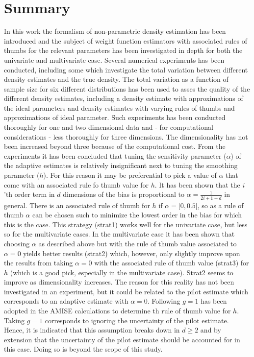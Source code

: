 \section{Summary}
In this work the formalism of non-parametric density estimation has been introduced and the subject of weight function estimators with associated rules of thumbs for the relevant parameters has been investigated in depth for both the univariate and multivariate case. Several numerical experiments has been conducted, including some which investigate the total variation between different density estimates and the true density. The total variation as a function of sample size for six different distributions has been used to asses the quality of the different density estimates, including a density estimate with approximations of the ideal parameters and density estimates with varying rules of thumbs and approximations of ideal parameter. Such experiments has been conducted thoroughly for one and two dimensional data and - for computational considerations - less thoroughly for three dimensions. The dimensionality has not been increased beyond three because of the computational cost. From the experiments it has been concluded that tuning the sensitivity parameter ($\alpha$) of the adaptive estimates is relatively insignificant next to tuning the smoothing parameter ($h$). For this reason it may be preferential to pick a value of $\alpha$ that come with an associated rule fo thumb value for $h$. It has been shown that the $i$'th order term in $d$ dimensions of the bias is proportional to $\alpha=\frac{1}{2i+1-d}$ in general. There is an associated rule of thumb for $h$ if $\alpha=[0,0.5[$, so as a rule of thumb $\alpha$ can be chosen such to minimize the lowest order in the bias for which this is the case. This strategy (strat1) works well for the univariate case, but less so for the multivariate cases. In the multivariate case it has been shown that choosing $\alpha$ as described above but with the rule of thumb value associated to $\alpha=0$ yields better results (strat2) which, however, only slightly improve upon the results from taking $\alpha=0$ with the associated rule of thumb value (strat3) for $h$ (which is a good pick, especially in the multivariate case). Strat2 seems to improve as dimensionality increases. The reason for this reality has not been investigated in an experiment, but it could be related to the pilot estimate which corresponds to an adaptive estimate with $\alpha=0$. Following \citep{silverman} $g=1$ has been adopted in the AMISE calculations to determine th rule of thumb value for $h$. Taking $g=1$ corresponds to ignoring the uncertainty of the pilot estimate. Hence, it is indicated that this assumption breaks down in $d\geq 2$ and by extension that the uncertainty of the pilot estimate should be accounted for in this case. Doing so is beyond the scope of this study.\newline
